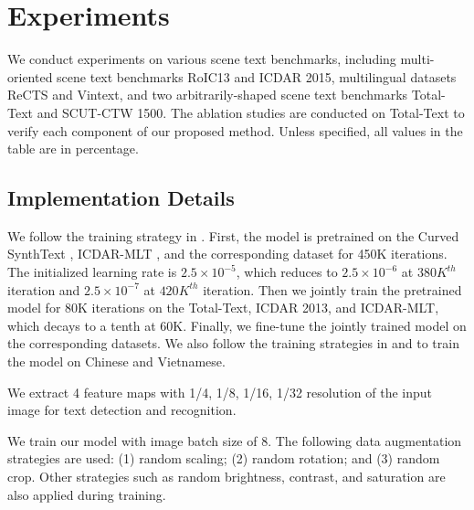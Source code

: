 \documentclass[10pt,twocolumn,letterpaper]{article}
\begin{document}
\section{Experiments}
We conduct experiments on various scene text benchmarks, including multi-oriented scene text benchmarks RoIC13\cite{liao2020mask} and ICDAR 2015\cite{karatzas2015icdar}, multilingual datasets ReCTS\cite{zhang2019icdar} and Vintext\cite{m_Nguyen-etal-CVPR21}, and two arbitrarily-shaped scene text benchmarks Total-Text\cite{ch2020total} and SCUT-CTW 1500\cite{liu2019curved}. The ablation studies are conducted on Total-Text to verify each component of our proposed method. Unless specified, all values in the table are in percentage.


\subsection{Implementation Details}
\label{Implementation Details}

We follow the training strategy in \cite{qiao2021mango}. First, the model is pretrained on the Curved SynthText \cite{liu2020abcnet}, ICDAR-MLT \cite{nayef2017icdar2017}, and the corresponding dataset for 450K iterations. The initialized learning rate is $2.5 \times 10 ^ {-5}$, which reduces to $2.5 \times 10 ^ {-6}$ at $380K ^ {th}$ iteration and $2.5 \times 10 ^ {-7}$ at $420K ^ {th}$ iteration. Then we jointly train the pretrained model for 80K iterations on the Total-Text, ICDAR 2013, and ICDAR-MLT, which decays to a tenth at 60K. Finally, we fine-tune the jointly trained model on the corresponding datasets. We also follow the training strategies in \cite{liu2021abcnetv2} and \cite{m_Nguyen-etal-CVPR21} to train the model on Chinese and Vietnamese.

We extract 4 feature maps with 1/4, 1/8, 1/16, 1/32 resolution of the input image for text detection and recognition. 

We train our model with image batch size of 8. 
The following data augmentation strategies are used:  
(1) random scaling; (2) random rotation; and (3) random crop. 
Other strategies such as random brightness, contrast, and saturation are also applied during training.
\end{document}
